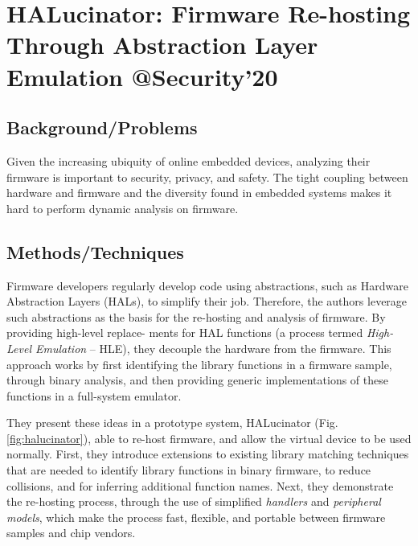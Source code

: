 \section{HALucinator: Firmware Re-hosting Through Abstraction Layer Emulation @Security'20}
\subsection{Background/Problems}
Given the increasing ubiquity of online embedded devices, analyzing their firmware is important to security, privacy, and safety. The tight coupling between hardware and firmware and the diversity found in embedded systems makes it hard to perform dynamic analysis on firmware.
\subsection{Methods/Techniques}
Firmware developers regularly develop code using abstractions, such as Hardware Abstraction Layers (HALs), to simplify their job.  Therefore, the authors leverage such abstractions as the basis for the re-hosting and analysis of firmware. By providing high-level replace- ments for HAL functions (a process termed \emph{High-Level Emulation} – HLE), they decouple the hardware from the firmware.  This approach works by first identifying the library functions in a firmware sample, through binary analysis, and then providing generic implementations of these functions in a full-system emulator.

They present these ideas in a prototype system, HALucinator (Fig.\ref{fig:halucinator}), able to re-host firmware, and allow the virtual device to be used normally. First, they introduce extensions to existing library matching techniques that are needed to identify library functions in binary firmware, to reduce collisions, and for inferring additional function names. Next, they demonstrate the re-hosting process, through the use of simplified \emph{handlers} and \emph{peripheral models}, which make the process fast, flexible, and portable between firmware samples and chip vendors.

